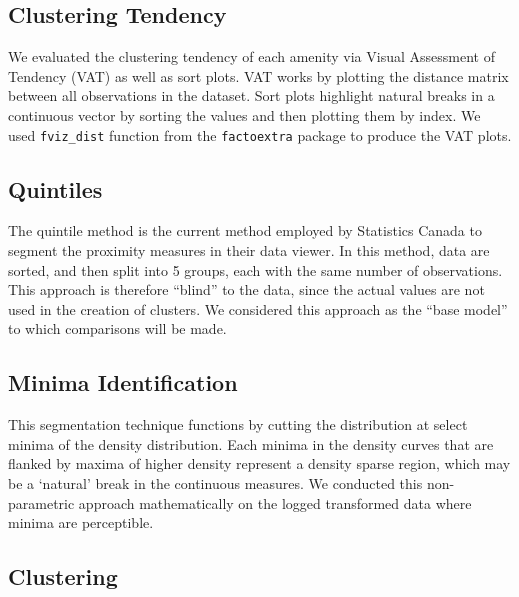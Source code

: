 \documentclass[11pt, a4paper]{article}
\begin{document}
\subsection{Clustering Tendency}


We evaluated the clustering tendency of each amenity via Visual Assessment of Tendency (VAT) as well as sort plots. VAT works by plotting the distance matrix between all observations in the dataset. Sort plots highlight natural breaks in a continuous vector by sorting the values and then plotting them by index. We used \texttt{fviz\_dist} function from the \texttt{factoextra} package to produce the VAT plots. 





\subsection{Quintiles}


The quintile method is the current method employed by Statistics Canada to segment the proximity measures in their data viewer. In this method, data are sorted, and then split into 5 groups, each with the same number of observations. This approach is therefore ``blind'' to the data, since the actual values are not used in the creation of clusters. We considered this approach as the “base model” to which comparisons will be made. 







\subsection{Minima Identification}


This segmentation technique functions by cutting the distribution at select minima of the density distribution. Each minima in the density curves that are flanked by maxima of higher density represent a density sparse region, which may be a `natural' break in the continuous measures. We conducted this non-parametric approach mathematically on the logged transformed data where minima are perceptible. 







\subsection{Clustering}
\end{document}
